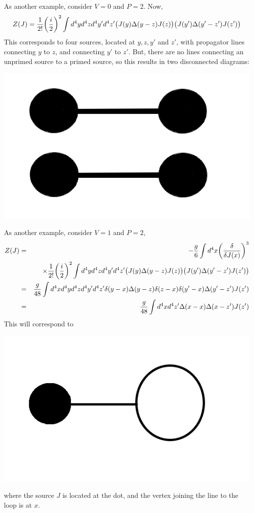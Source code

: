 \documentclass[12pt,epsf]{article}
\def\nolabel{\nonumber }
\def\nolabel{\nonumber }
\begin{document}
As another example, consider $V=0$ and $P=2$.  Now,
\begin{eqnarray}
Z(J) = {1\over 2!} \bigg({i\over 2}\bigg)^2 \int
d^4yd^4zd^4y'd^4z'\big(J(y)\Delta(y-z)J(z)\big)\big(J(y')
\Delta(y'-z')J(z')\big)\nolabel
\end{eqnarray}
This corresponds to four sources, located at $y,z,y'$ and $z'$, with
propagator lines connecting $y$ to $z$, and connecting $y'$ to $z'$. 
But, there are no lines connecting an unprimed source to a primed
source, so this results in two disconnected diagrams:
\begin{center}
\includegraphics[scale = .2]{feynmandiagram2.png}
\end{center}

As another example, consider $V=1$ and $P=2$,
\begin{eqnarray}
Z(J) &=& -{g\over 6} \int d^4x\bigg({\delta \over \delta J(x)}\bigg)^3
\nolabel \\
& & \times {1\over 2!} \bigg({i \over 2}\bigg)^2\int
d^4yd^4zd^4y'd^4z'\big(J(y)\Delta(y-z)J(z)\big)\big(J(y')
\Delta(y'-z')J(z')\big) \nolabel \\
&=& {g \over 48}\int
d^4xd^4yd^4zd^4y'd^4z'\delta(y-x)\Delta(y-z)\delta(z-x)\delta(y'-x)
\Delta(y'-z')J(z') \nolabel \\
&=& {g\over 48} \int d^4xd^4z' \Delta(x-x)\Delta(x-z') J(z')\nolabel
\end{eqnarray}
This will correspond to
\begin{center}
\includegraphics[scale = .2]{feynmandiagram3.png}
\end{center}
where the source $J$ is located at the dot, and the vertex joining the
line to the loop is at $x$.  
\end{document}
